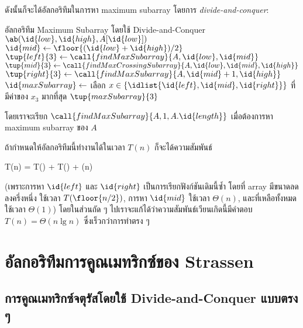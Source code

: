 ดังนั้นก็จะได้อัลกอริทึมในการหา maximum subarray โดยการ \emph{divide-and-conquer}:
\begin{icodebox}{อัลกอริทึม Maximum Subarray โดยใช้ Divide-and-Conquer}
			\State \Return $\ab(\id{low}, \id{high}, A[\id{low}])$ 
		\EndIf
		\State $\id{mid} \gets \floor{(\id{low} + \id{high})/2}$
		\State $\tup{left}{3} \gets \call{findMaxSubarray}{A, \id{low}, \id{mid}}$
		\State $\tup{mid}{3} \gets \call{findMaxCrossingSubarray}{A, \id{low}, \id{mid}, \id{high}}$
		\State $\tup{right}{3} \gets \call{findMaxSubarray}{A, \id{mid}+1, \id{high}}$
		\State $\id{maxSubarray} \gets$ เลือก $x \in \{\idlist{\id{left}, \id{mid}, \id{right}}\}$ ที่มีค่าของ $x_3$ มากที่สุด
		\State \Return $\tup{maxSubarray}{3}$
	\EndFunction
\end{icodebox}
โดยเราจะเรียก $\call{findMaxSubarray}{A, 1, A.\id{length}}$ เมื่อต้องการหา maximum subarray ของ $A$ 

ถ้ากำหนดให้อัลกอริทึมนี้ทำงานได้ในเวลา $T(n)$ ก็จะได้ความสัมพันธ์
\begin{eqnobox}
	T(n) = T() + T() + \Theta(n)
\end{eqnobox}
(เพราะการหา $\id{left}$ และ $\id{right}$ เป็นการเรียกฟังก์ชันเดิมนี้ซ้ำ โดยที่ array มีขนาดลดลงครึ่งหนึ่ง ใช้เวลา $T(\floor{n/2})$, การหา $\id{mid}$ ใช้เวลา $\Theta(n)$, และที่เหลือทั้งหมดใช้เวลา $\Theta(1)$) โดยในส่วนถัด ๆ ไปเราจะแก้ได้ว่าความสัมพันธ์เวียนเกิดนี้มีคำตอบ $T(n) = \Theta(n\lg n)$ ซึ่งเร็วกว่าการทำตรง ๆ

\section{อัลกอริทึมการคูณเมทริกซ์ของ Strassen}

\subsection{การคูณเมทริกซ์จตุรัสโดยใช้ Divide-and-Conquer แบบตรง ๆ}

